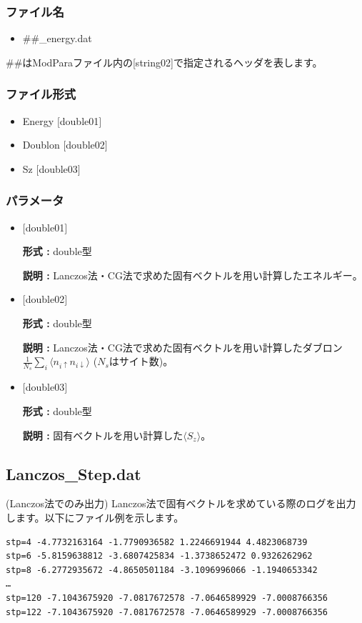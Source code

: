 \subsubsection{ファイル名}
\begin{itemize}
   \item  \#\#\_energy.dat
 \end{itemize}
  \#\#はModParaファイル内の[string02]で指定されるヘッダを表します。


\subsubsection{ファイル形式}
 \begin{itemize}
   \item Energy $[$double01$]$
   \item Doublon $[$double02$]$
   \item Sz $[$double03$]$
  \end{itemize}
\subsubsection{パラメータ}
 \begin{itemize}

  \item  $[$double01$]$
  
 {\bf 形式 :} double型

{\bf 説明 :} Lanczos法・CG法で求めた固有ベクトルを用い計算したエネルギー。
 
  \item  $[$double02$]$

 {\bf 形式 :} double型 

{\bf 説明 :} Lanczos法・CG法で求めた固有ベクトルを用い計算したダブロン
$\frac{1}{N_s} \sum_{i}\langle n_{i\uparrow}n_{i\downarrow}\rangle$ ($N_s$はサイト数)。

 \item  $[$double03$]$

 {\bf 形式 :} double型 

{\bf 説明 :} 固有ベクトルを用い計算した$\langle S_z\rangle$。

 \end{itemize}

\newpage
\subsection{Lanczos\_Step.dat}
(Lanczos法でのみ出力) Lanczos法で固有ベクトルを求めている際のログを出力します。以下にファイル例を示します。\\
\begin{minipage}{15cm}
\begin{screen}
\begin{verbatim}
stp=4 -4.7732163164 -1.7790936582 1.2246691944 4.4823068739
stp=6 -5.8159638812 -3.6807425834 -1.3738652472 0.9326262962
stp=8 -6.2772935672 -4.8650501184 -3.1096996066 -1.1940653342
…
stp=120 -7.1043675920 -7.0817672578 -7.0646589929 -7.0008766356
stp=122 -7.1043675920 -7.0817672578 -7.0646589929 -7.0008766356
\end{verbatim}
\end{screen}
\end{minipage}

